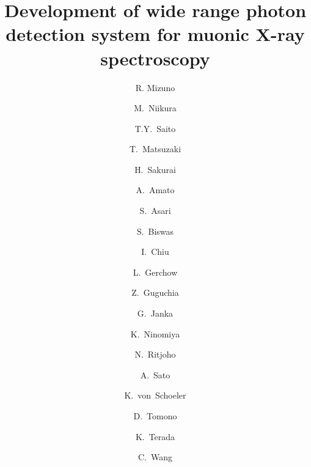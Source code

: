 \documentclass[a4paper,fleqn]{cas-dc}
\begin{document}
\let\WriteBookmarks\relax
\def\floatpagepagefraction{1}
\def\textpagefraction{.001}



\title[mode=title]{Development of wide range photon detection system for muonic X-ray spectroscopy}  



%

\author[1]{R. Mizuno}

\cormark[1] 

\fnmark[1]





\author[1,2]{M.~Niikura}
\author[3,1,4]{T.Y.~Saito}
\author[2]{T.~Matsuzaki}
\author[1,2]{H.~Sakurai}
\author[5]{A.~Amato}
\author[6]{S.~Asari}
\author[5]{S.~Biswas}
\author[7]{I.~Chiu}
\author[5]{L.~Gerchow}
\author[5]{Z.~Guguchia}
\author[5]{G.~Janka}
\author[8]{K.~Ninomiya}
\author[9]{N.~Ritjoho}
\author[10]{A.~Sato}
\author[11,5]{K.~von~Schoeler}
\author[12]{D.~Tomono}
\author[13]{K.~Terada}
\author[5]{C.~Wang}
\end{document}
